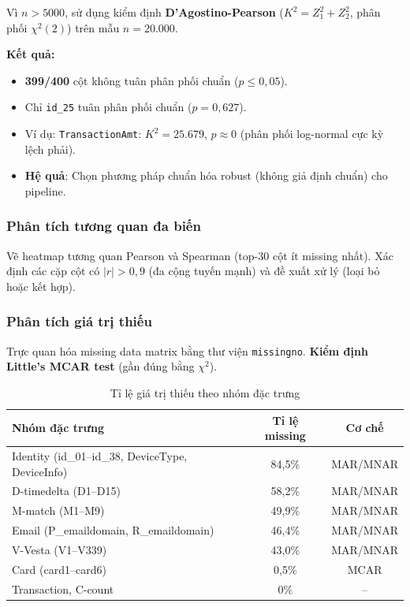 \documentclass[12pt,a4paper]{article}
\let\oldtextbf\textbf
\renewcommand{\textbf}[1]{\oldtextbf{\textcolor{hcmublue}{#1}}}
\begin{document}
Vì $n > 5000$, sử dụng kiểm định \textbf{D'Agostino-Pearson} ($K^2 = Z_1^2 + Z_2^2$, phân phối $\chi^2(2)$) trên mẫu $n = 20.000$.

\textbf{Kết quả:}
\begin{itemize}
    \item \textbf{399/400} cột không tuân phân phối chuẩn ($p \leq 0{,}05$).
    \item Chỉ \texttt{id\_25} tuân phân phối chuẩn ($p = 0{,}627$).
    \item Ví dụ: \texttt{TransactionAmt}: $K^2 = 25.679$, $p \approx 0$ (phân phối log-normal cực kỳ lệch phải).
    \item \textbf{Hệ quả}: Chọn phương pháp chuẩn hóa robust (không giả định chuẩn) cho pipeline.
\end{itemize}

\subsubsection{Phân tích tương quan đa biến}

Vẽ heatmap tương quan Pearson và Spearman (top-30 cột ít missing nhất). Xác định các cặp cột có $|r| > 0{,}9$ (đa cộng tuyến mạnh) và đề xuất xử lý (loại bỏ hoặc kết hợp).

\subsubsection{Phân tích giá trị thiếu}

Trực quan hóa missing data matrix bằng thư viện \texttt{missingno}. \textbf{Kiểm định Little's MCAR test} (gần đúng bằng $\chi^2$).

\begin{table}[H]
\centering
\begin{tabular}{|l|c|c|}
\hline
\textbf{Nhóm đặc trưng} & \textbf{Tỉ lệ missing} & \textbf{Cơ chế} \\ \hline
Identity (id\_01--id\_38, DeviceType, DeviceInfo) & 84,5\% & MAR/MNAR \\ \hline
D-timedelta (D1--D15) & 58,2\% & MAR/MNAR \\ \hline
M-match (M1--M9) & 49,9\% & MAR/MNAR \\ \hline
Email (P\_emaildomain, R\_emaildomain) & 46,4\% & MAR/MNAR \\ \hline
V-Vesta (V1--V339) & 43,0\% & MAR/MNAR \\ \hline
Card (card1--card6) & 0,5\% & MCAR \\ \hline
Transaction, C-count & 0\% & -- \\ \hline
\end{tabular}
\caption{Tỉ lệ giá trị thiếu theo nhóm đặc trưng}
\label{tab:missing_rates}
\end{table}
\end{document}
